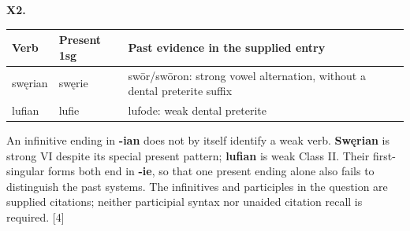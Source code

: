 \par\begin{minipage}{\linewidth}\raggedright
\textbf{X2.}

\par\begingroup
\fontsize{10.5}{13.2}\selectfont
\setlength{\LTleft}{0pt}\setlength{\LTright}{\fill}
\noindent
\begin{tabular}{@{}>{\raggedright\arraybackslash}p{20.06mm}>{\raggedright\arraybackslash}p{20.06mm}>{\raggedright\arraybackslash}p{78.25mm}@{}}
\toprule
\textbf{Verb} & \textbf{Present 1sg} & \textbf{Past evidence in the supplied entry} \\
\midrule
swęrian & swęrie & swōr/\allowbreak{}swōron: strong vowel alternation, without a dental preterite suffix \\
lufian & lufie & lufode: weak dental preterite \\
\bottomrule
\end{tabular}
\par\endgroup

An infinitive ending in \textbf{-ian} does not by itself identify a weak verb. \textbf{Swęrian} is strong VI despite its special present pattern; \textbf{lufian} is weak Class II. Their first-singular forms both end in \textbf{-ie}, so that one present ending alone also fails to distinguish the past systems. The infinitives and participles in the question are supplied citations; neither participial syntax nor unaided citation recall is required. [4]

\end{minipage}\par\addvspace{4pt}

